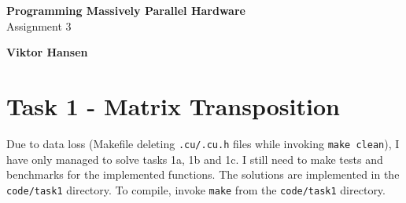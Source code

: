 \documentclass[11pt,a4paper,english]{article}
\begin{document}
\thispagestyle{empty} %
\hspace{6cm} \vspace{6cm}
\begin{center}
\textbf{\Huge {Programming Massively Parallel Hardware}}\\ \vspace{0.5cm}
\Large{Assignment 3}
\end{center}
\vspace{3cm}
\begin{center}
\Large{\textbf{Viktor Hansen}}
\end{center}
\vspace{6.0cm}
\thispagestyle{empty}

\newpage

\section*{Task 1 - Matrix Transposition}
Due to data loss (Makefile deleting \texttt{.cu/.cu.h} files while invoking \texttt{make clean}), I have only managed to solve tasks 1a, 1b and 1c. I still need to make tests and benchmarks for the implemented functions. The solutions are implemented in the \texttt{code/task1} directory. To compile, invoke \texttt{make} from the \texttt{code/task1} directory.

%
%



\end{document}
